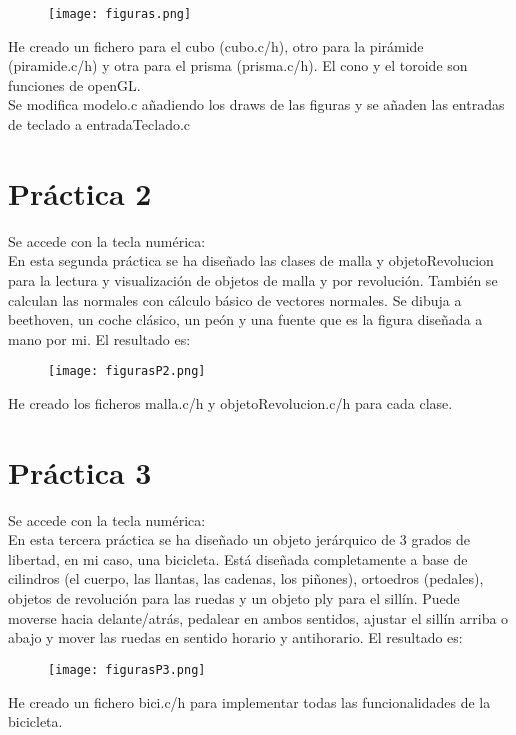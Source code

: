 \begin{figure}[H]
	\centering
	\texttt{[image: figuras.png]}
\end{figure} 

He creado un fichero para el cubo (cubo.c/h), otro para la pirámide (piramide.c/h) y otra para el prisma (prisma.c/h). El cono y el toroide son funciones de openGL. \\
Se modifica modelo.c añadiendo los draws de las figuras y se añaden las entradas de teclado a entradaTeclado.c

\section{Práctica 2}
Se accede con la tecla numérica: \\
En esta segunda práctica se ha diseñado las clases de malla y objetoRevolucion para la lectura y visualización de objetos de malla y por revolución. También se calculan las normales con cálculo básico de vectores normales. Se dibuja a beethoven, un coche clásico, un peón y una fuente que es la figura diseñada a mano por mi. El resultado es:
\begin{figure}[H]
	\centering
	\texttt{[image: figurasP2.png]}
\end{figure} 

He creado los ficheros malla.c/h y objetoRevolucion.c/h para cada clase. 

\section{Práctica 3}
Se accede con la tecla numérica: \\
En esta tercera práctica se ha diseñado un objeto jerárquico de 3 grados de libertad, en mi caso, una bicicleta. Está diseñada completamente a base de cilindros (el cuerpo, las llantas, las cadenas, los piñones), ortoedros (pedales),  objetos de revolución para las ruedas y un objeto ply para el sillín. Puede moverse hacia delante/atrás, pedalear en ambos sentidos, ajustar el sillín arriba o abajo y mover las ruedas en sentido horario y antihorario. El resultado es:
\begin{figure}[H]
	\centering
	\texttt{[image: figurasP3.png]}
\end{figure} 

He creado un fichero bici.c/h para implementar todas las funcionalidades de la bicicleta.

